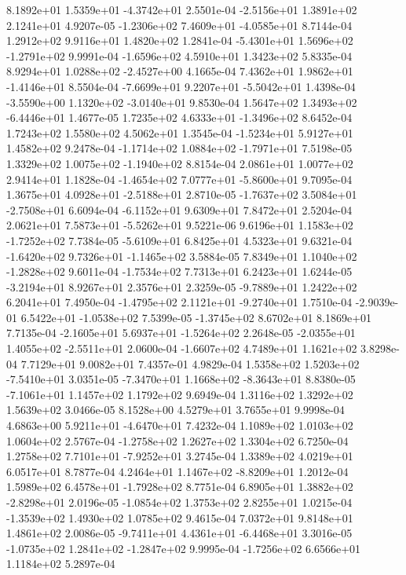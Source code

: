  8.1892e+01  1.5359e+01 -4.3742e+01  2.5501e-04
-2.5156e+01  1.3891e+02  2.1241e+01  4.9207e-05
-1.2306e+02  7.4609e+01 -4.0585e+01  8.7144e-04
1.2912e+02 9.9116e+01 1.4820e+02  1.2841e-04
-5.4301e+01  1.5696e+02 -1.2791e+02  9.9991e-04
-1.6596e+02  4.5910e+01  1.3423e+02  5.8335e-04
 8.9294e+01  1.0288e+02 -2.4527e+00  4.1665e-04
 7.4362e+01  1.9862e+01 -1.4146e+01  8.5504e-04
-7.6699e+01  9.2207e+01 -5.5042e+01  1.4398e-04
-3.5590e+00  1.1320e+02 -3.0140e+01  9.8530e-04
 1.5647e+02  1.3493e+02 -6.4446e+01  1.4677e-05
 1.7235e+02  4.6333e+01 -1.3496e+02  8.6452e-04
1.7243e+02 1.5580e+02 4.5062e+01  1.3545e-04
-1.5234e+01  5.9127e+01  1.4582e+02  9.2478e-04
-1.1714e+02  1.0884e+02 -1.7971e+01  7.5198e-05
 1.3329e+02  1.0075e+02 -1.1940e+02  8.8154e-04
2.0861e+01 1.0077e+02 2.9414e+01  1.1828e-04
-1.4654e+02  7.0777e+01 -5.8600e+01  9.7095e-04
 1.3675e+01  4.0928e+01 -2.5188e+01  2.8710e-05
-1.7637e+02  3.5084e+01 -2.7508e+01  6.6094e-04
-6.1152e+01  9.6309e+01  7.8472e+01  2.5204e-04
 2.0621e+01  7.5873e+01 -5.5262e+01  9.5221e-06
 9.6196e+01  1.1583e+02 -1.7252e+02  7.7384e-05
-5.6109e+01  6.8425e+01  4.5323e+01  9.6321e-04
-1.6420e+02  9.7326e+01 -1.1465e+02  3.5884e-05
 7.8349e+01  1.1040e+02 -1.2828e+02  9.6011e-04
-1.7534e+02  7.7313e+01  6.2423e+01  1.6244e-05
-3.2194e+01  8.9267e+01  2.3576e+01  2.3259e-05
-9.7889e+01  1.2422e+02  6.2041e+01  7.4950e-04
-1.4795e+02  2.1121e+01 -9.2740e+01  1.7510e-04
-2.9039e-01  6.5422e+01 -1.0538e+02  7.5399e-05
-1.3745e+02  8.6702e+01  8.1869e+01  7.7135e-04
-2.1605e+01  5.6937e+01 -1.5264e+02  2.2648e-05
-2.0355e+01  1.4055e+02 -2.5511e+01  2.0600e-04
-1.6607e+02  4.7489e+01  1.1621e+02  3.8298e-04
7.7129e+01 9.0082e+01 7.4357e-01  4.9829e-04
 1.5358e+02  1.5203e+02 -7.5410e+01  3.0351e-05
-7.3470e+01  1.1668e+02 -8.3643e+01  8.8380e-05
-7.1061e+01  1.1457e+02  1.1792e+02  9.6949e-04
1.3116e+02 1.3292e+02 1.5639e+02  3.0466e-05
8.1528e+00 4.5279e+01 3.7655e+01  9.9998e-04
 4.6863e+00  5.9211e+01 -4.6470e+01  7.4232e-04
1.1089e+02 1.0103e+02 1.0604e+02  2.5767e-04
-1.2758e+02  1.2627e+02  1.3304e+02  6.7250e-04
 1.2758e+02  7.7101e+01 -7.9252e+01  3.2745e-04
1.3389e+02 4.0219e+01 6.0517e+01  8.7877e-04
 4.2464e+01  1.1467e+02 -8.8209e+01  1.2012e-04
 1.5989e+02  6.4578e+01 -1.7928e+02  8.7751e-04
 6.8905e+01  1.3882e+02 -2.8298e+01  2.0196e-05
-1.0854e+02  1.3753e+02  2.8255e+01  1.0215e-04
-1.3539e+02  1.4930e+02  1.0785e+02  9.4615e-04
7.0372e+01 9.8148e+01 1.4861e+02  2.0086e-05
-9.7411e+01  4.4361e+01 -6.4468e+01  3.3016e-05
-1.0735e+02  1.2841e+02 -1.2847e+02  9.9995e-04
-1.7256e+02  6.6566e+01  1.1184e+02  5.2897e-04
